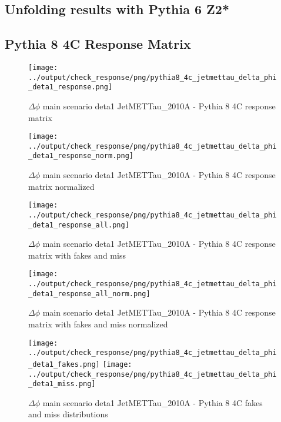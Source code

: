 \documentclass[11pt]{book}
\begin{document}
\clearpage
\subsection{Unfolding results with Pythia 6 Z2*}


\clearpage
\subsection{Pythia 8 4C Response Matrix}


\begin{figure}[ht]
\centering
\texttt{[image: ../output/check\_response/png/pythia8\_4c\_jetmettau\_delta\_phi\_deta1\_response.png]}
\caption{$\Delta\phi$ main scenario deta1 JetMETTau\_2010A - Pythia 8 4C response matrix}
\label{p8_jetmettau_delta_phi_deta1_response}
\end{figure}

\begin{figure}[ht]
\centering
\texttt{[image: ../output/check\_response/png/pythia8\_4c\_jetmettau\_delta\_phi\_deta1\_response\_norm.png]}
\caption{$\Delta\phi$ main scenario deta1 JetMETTau\_2010A - Pythia 8 4C response matrix normalized}
\label{p8_jetmettau_delta_phi_deta1_response_norm}
\end{figure}

\begin{figure}[ht]
\centering
\texttt{[image: ../output/check\_response/png/pythia8\_4c\_jetmettau\_delta\_phi\_deta1\_response\_all.png]}
\caption{$\Delta\phi$ main scenario deta1 JetMETTau\_2010A - Pythia 8 4C response matrix with fakes and miss}
\label{p8_jetmettau_delta_phi_deta1_response_all}
\end{figure}

\begin{figure}[ht]
\centering
\texttt{[image: ../output/check\_response/png/pythia8\_4c\_jetmettau\_delta\_phi\_deta1\_response\_all\_norm.png]}
\caption{$\Delta\phi$ main scenario deta1 JetMETTau\_2010A - Pythia 8 4C response matrix with fakes and miss normalized}
\label{p8_jetmettau_delta_phi_deta1_response_all_norm}
\end{figure}

\begin{figure}[ht]
\centering
\texttt{[image: ../output/check\_response/png/pythia8\_4c\_jetmettau\_delta\_phi\_deta1\_fakes.png]}
\texttt{[image: ../output/check\_response/png/pythia8\_4c\_jetmettau\_delta\_phi\_deta1\_miss.png]}
\caption{$\Delta\phi$ main scenario deta1 JetMETTau\_2010A - Pythia 8 4C fakes and miss distributions}
\label{p8_jetmettau_delta_phi_deta1_fakesmiss}
\end{figure}
\end{document}
